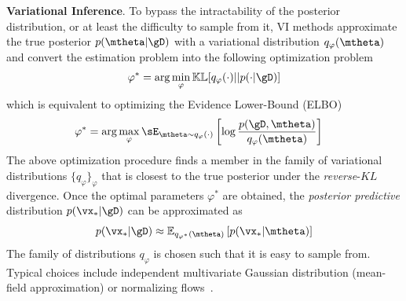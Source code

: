 \textbf{Variational Inference}. To bypass the intractability of the posterior distribution, or at least the difficulty to sample from it, VI methods approximate the true posterior $p(\mtheta | \gD)$ with a variational distribution $q_\varphi(\mtheta)$ and convert the estimation problem into the following optimization problem
\begin{align}
    \varphi^* = \arg\min_\varphi \mathbb{KL}[q_\varphi(\cdot) || p(\cdot | \gD)]
\end{align} 
which is equivalent to optimizing the Evidence Lower-Bound (ELBO)~\citep{Gelman2013-bayesdata}
\begin{align}
    \varphi^* &= \arg\max_\varphi \sE_{\mtheta \sim q_\varphi(\cdot)}\left[\log \frac{p(\gD, \mtheta)}{q_\varphi(\mtheta)}\right]
\end{align}
The above optimization procedure finds a member in the family of variational distributions $\{q_\varphi\}_\varphi$ that is closest to the true posterior under the \textit{reverse}-$KL$ divergence. Once the optimal parameters $\varphi^*$ are obtained, the \textit{posterior predictive} distribution $p(\vx_* | \gD)$ can be approximated as
\begin{align}
    p(\vx_* | \gD) \approx \mathbb{E}_{q_{\varphi^*}(\mtheta)}\left[p(\vx_* | \mtheta)\right]
\end{align}
The family of distributions $q_\varphi$ is chosen such that it is easy to sample from. Typical choices include independent multivariate Gaussian distribution (mean-field approximation) or normalizing flows~\citep{rezende2015variational,papamakarios2021normalizing,freia}.

